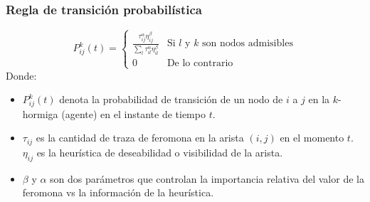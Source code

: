 \subsubsection{Regla de transición probabilística}
\begin{equation}
    P_{ij}^k(t)=\begin{cases} \frac{\tau_{ij}^{\alpha}\eta_{ij}^{\beta}}{\sum_l\tau_{il}^{\alpha}\eta_{il}^{\beta}} & \text{Si $l$ y $k$ son nodos admisibles} \\ 0 & \text{De lo contrario} \end{cases}
\end{equation}
Donde:
\begin{itemize}
    \item $P_{ij}^k(t)$ denota la probabilidad de transición de un nodo de $i$ a $j$ en la $k$-hormiga (agente) en el instante de tiempo $t$.
    \item $\tau_{ij}$ es la cantidad de traza de feromona en la arista $(i,j)$ en el momento $t$. $\eta_{ij}$ es la heurística de deseabilidad o visibilidad de la arista.
    \item $\beta$ y $\alpha$ son dos parámetros que controlan la importancia relativa del valor de la feromona vs la información de la heurística.
\end{itemize}

